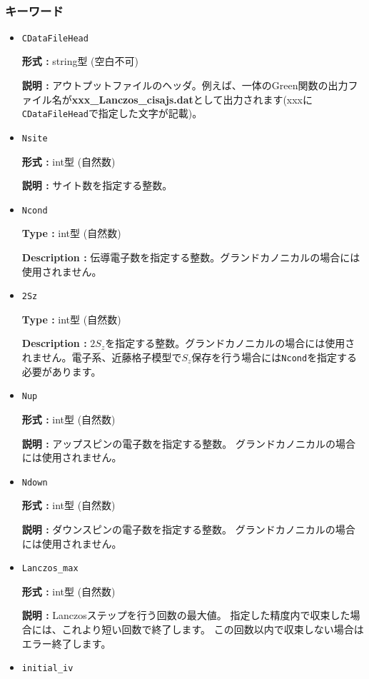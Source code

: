 ~\subsubsection{キーワード}
 \begin{itemize}
  \item  \verb|CDataFileHead|

 {\bf 形式 :} string型 (空白不可)

{\bf 説明 :} アウトプットファイルのヘッダ。例えば、一体のGreen関数の出力ファイル名が{\bf xxx\_Lanczos\_cisajs.dat}として出力されます(xxxに\verb|CDataFileHead|で指定した文字が記載)。
   
 \item  \verb|Nsite|

{\bf 形式 :} int型 (自然数)

{\bf 説明 :} サイト数を指定する整数。  

\item  \verb|Ncond|

{\bf Type :} {int型 (自然数)}

{\bf Description :} {伝導電子数を指定する整数。グランドカノニカルの場合には使用されません。}

 \item  \verb|2Sz|

{\bf Type :} {int型 (自然数)}

{\bf Description :} {$2S_z$を指定する整数。グランドカノニカルの場合には使用されません。電子系、近藤格子模型で$S_z$保存を行う場合には}\verb|Ncond|を指定する必要があります。

 \item  \verb|Nup|

{\bf 形式 :} int型 (自然数)

{\bf 説明 :} アップスピンの電子数を指定する整数。
グランドカノニカルの場合には使用されません。  

 \item  \verb|Ndown|

{\bf 形式 :} int型 (自然数)

{\bf 説明 :} ダウンスピンの電子数を指定する整数。
グランドカノニカルの場合には使用されません。  

 \item  \verb|Lanczos_max|

{\bf 形式 :} int型 (自然数)

{\bf 説明 :}  Lanczosステップを行う回数の最大値。
指定した精度内で収束した場合には、これより短い回数で終了します。
この回数以内で収束しない場合はエラー終了します。

 \item  \verb|initial_iv|


\end{itemize}
